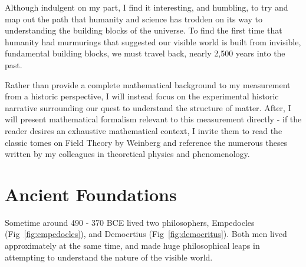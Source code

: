 Although indulgent on my part, I find it interesting, and humbling, to try and
map out the path that humanity and science has trodden on its way to
understanding the building blocks of the universe. To find the first time that
humanity had murmurings that suggested our visible world is built from
invisible, fundamental building blocks, we must travel back, nearly 2,500 years
into the past.

Rather than provide a complete mathematical background to my measurement from a
historic perspective, I will instead focus on the experimental historic
narrative surrounding our quest to understand the structure of matter. After, I
will present mathematical formalism relevant to this measurement directly - if
the reader desires an exhaustive mathematical context, I invite them to read the
classic tomes on Field Theory by Weinberg and reference the numerous theses
written by my colleagues in theoretical physics and phenomenology.

\section{Ancient Foundations}
Sometime around 490 - 370 BCE lived two philosophers, Empedocles
(Fig~\ref{fig:empedocles}), and Democrtius (Fig~\ref{fig:democritus}). Both men
lived approximately at the same time, and made huge philosophical leaps in
attempting to understand the nature of the visible world.

